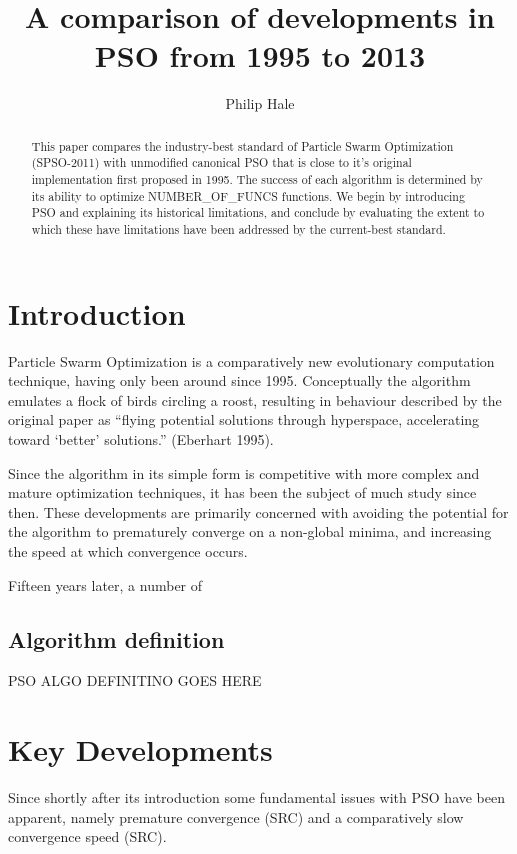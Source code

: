\documentclass{csfourzero}
\author{Philip Hale}
\title{A comparison of developments in PSO from 1995 to 2013}
\begin{document}
\begin{titlepage}
  \maketitle
  \begin{abstract}
  This paper compares the industry-best standard of Particle Swarm Optimization
  (SPSO-2011) with unmodified canonical PSO that is close to it's original
  implementation first proposed in 1995. The success of each algorithm is
  determined by its ability to optimize NUMBER_OF_FUNCS functions. We begin by
  introducing PSO and explaining its historical limitations, and conclude by
  evaluating the extent to which these have limitations have been addressed by
  the current-best standard.
  \end{abstract}
  \tableofcontents
\end{titlepage}

\section{Introduction}

Particle Swarm Optimization is a comparatively new evolutionary computation
technique, having only been around since 1995.  Conceptually the algorithm
emulates a flock of birds circling a roost, resulting in  behaviour described by
the original paper as ``flying potential solutions through hyperspace,
accelerating toward `better' solutions.'' (Eberhart 1995).

Since the algorithm in its simple form is competitive with more complex and
mature optimization techniques, it has been the subject of much study since
then. These developments are primarily concerned with avoiding the potential for
the algorithm to prematurely converge on a non-global minima, and increasing the
speed at which convergence occurs.

Fifteen years later, a number of 

\subsection{Algorithm definition}

PSO ALGO DEFINITINO GOES HERE

\section{Key Developments}

Since shortly after its introduction some fundamental issues with PSO have been
apparent, namely premature convergence (SRC) and a comparatively slow convergence
speed (SRC).
\end{document}
